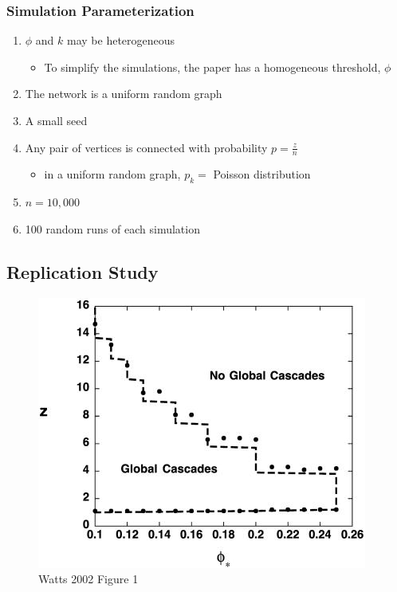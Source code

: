 \documentclass[compress]{beamer}
\begin{document}
    \begin{frame}[Basic2]\frametitle{Simulation Parameterization}
        \footnotesize{
            \begin{enumerate}
                \item $\phi$ and $k$ may be heterogeneous
                \begin{itemize}
                    \item To simplify the simulations, the paper has a homogeneous threshold, $\phi$
                \end{itemize}
                \item The network is a uniform random graph
                \item A small seed
                \item  Any pair of vertices is connected with probability $p = \frac{z}{n}$
                \begin{itemize}
                    \item in a uniform random graph, $p_k = $ Poisson distribution
                \end{itemize}
                \item $n = 10,000$
                \item 100 random runs of each simulation
            \end{enumerate}
        }
    \end{frame}

\subsection{Replication Study}

    \begin{frame}[BlankLogo]
        \begin{figure}
            \centering
            \includegraphics[height=0.8\textheight]{../figures/watts-fig-1}
            \caption{Watts 2002 Figure 1}
            \label{fig:watts-fig-1}
        \end{figure}
    \end{frame}
    
\end{document}
